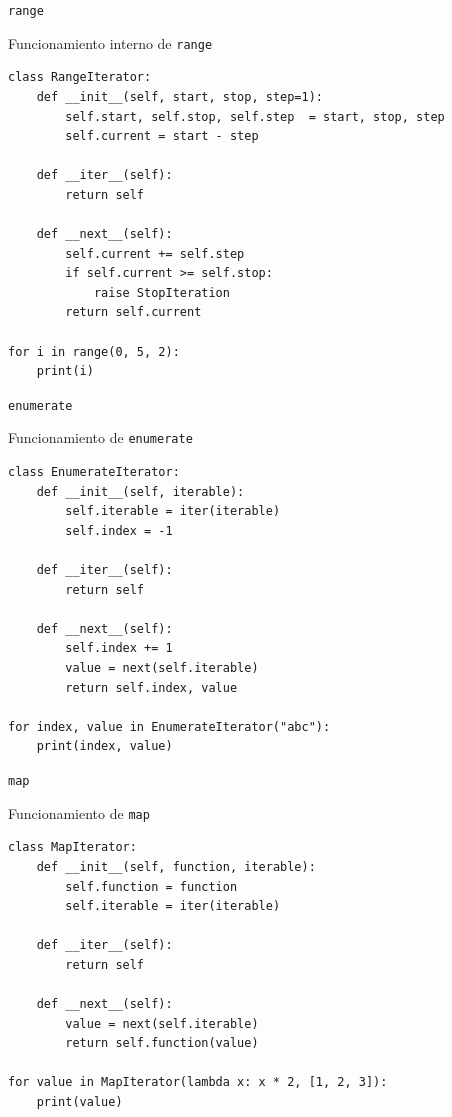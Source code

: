 \documentclass[12pt]{beamer}
\begin{document}
\begin{frame}[fragile]{\texttt{range}}
\begin{block}{Funcionamiento interno de \texttt{range}}
\begin{verbatim}
class RangeIterator:
    def __init__(self, start, stop, step=1):
        self.start, self.stop, self.step  = start, stop, step
        self.current = start - step

    def __iter__(self):
        return self

    def __next__(self):
        self.current += self.step
        if self.current >= self.stop:
            raise StopIteration
        return self.current

for i in range(0, 5, 2):
    print(i)
\end{verbatim}
\end{block}  
\end{frame}

\begin{frame}[fragile]{\texttt{enumerate}}
\begin{block}{Funcionamiento de \texttt{enumerate}}
\begin{verbatim}
class EnumerateIterator:
    def __init__(self, iterable):
        self.iterable = iter(iterable)
        self.index = -1

    def __iter__(self):
        return self

    def __next__(self):
        self.index += 1
        value = next(self.iterable)
        return self.index, value

for index, value in EnumerateIterator("abc"):
    print(index, value)
\end{verbatim}
\end{block}  
\end{frame}

\begin{frame}[fragile]{\texttt{map}}
\begin{block}{Funcionamiento de \texttt{map}}
\begin{verbatim}
class MapIterator:
    def __init__(self, function, iterable):
        self.function = function
        self.iterable = iter(iterable)

    def __iter__(self):
        return self

    def __next__(self):
        value = next(self.iterable)
        return self.function(value)

for value in MapIterator(lambda x: x * 2, [1, 2, 3]):
    print(value)
\end{verbatim}
\end{block}  
\end{frame}
\end{document}
